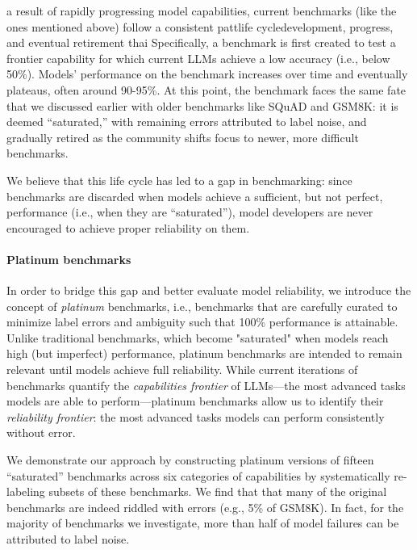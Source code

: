  a result of rapidly progressing model capabilities, current benchmarks (like the ones mentioned above) follow a consistent pattlife cycledevelopment, progress, and eventual retirement thai
Specifically, a benchmark is first created to test a frontier capability for which current LLMs achieve a low accuracy (i.e., below 50\%). Models' performance on the benchmark increases over time and eventually plateaus, often around 90-95\%. At this point, the benchmark faces the same fate that we discussed earlier with older benchmarks like SQuAD and GSM8K: it is deemed ``saturated,'' with remaining errors attributed to label noise, and gradually retired as the community shifts focus to newer, more difficult benchmarks.

We believe that this life cycle has led to a gap in benchmarking: since benchmarks are discarded when models achieve a sufficient, but not perfect, performance (i.e., when they are ``saturated''), model developers are never encouraged to achieve proper reliability on them. 




\vspace{-4pt}
\paragraph{Platinum benchmarks} In order to bridge this gap and better evaluate model reliability, 
we introduce the concept of \textit{platinum} benchmarks, i.e., benchmarks that are carefully curated to minimize label errors and ambiguity such that 100\% performance is attainable. Unlike traditional benchmarks, which become "saturated" when models reach high (but imperfect) performance, platinum benchmarks are intended to remain relevant until models achieve full reliability.
While current iterations of benchmarks quantify the \textit{capabilities frontier} of LLMs---the most advanced tasks models are able to perform---platinum benchmarks allow us to identify their \textit{reliability frontier}: the most advanced tasks models can perform consistently without error.





We demonstrate our approach by constructing platinum versions of fifteen ``saturated'' benchmarks across six categories of capabilities by systematically re-labeling subsets of these benchmarks. We find that that many of the original benchmarks are indeed riddled with errors (e.g., 5\% of GSM8K). In fact, for the majority of benchmarks we investigate, more than half of model failures can be attributed to label noise.


